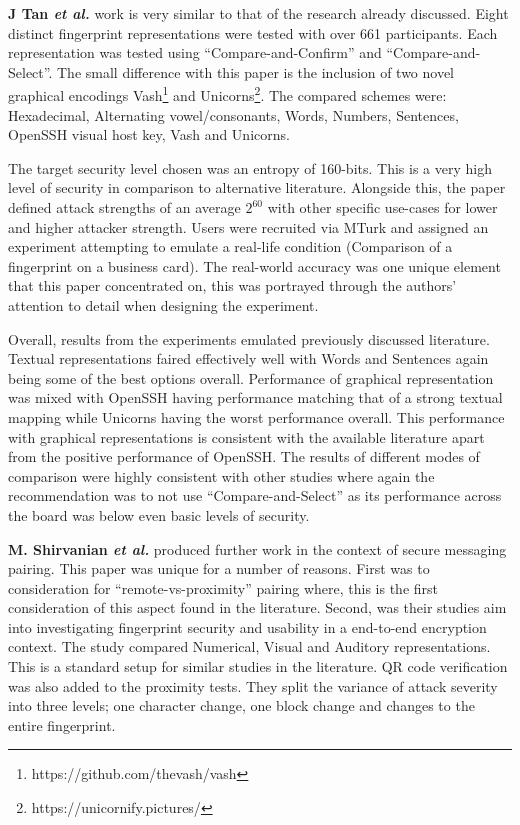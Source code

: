 \textbf{J Tan \textit{et al.}}\cite{tan2017can} work is very similar to that of the research already discussed. Eight distinct fingerprint representations were tested with over 661 participants. Each representation was tested using ``Compare-and-Confirm'' and ``Compare-and-Select''. The small difference with this paper is the inclusion of two novel graphical encodings Vash\footnote{https://github.com/thevash/vash} and Unicorns\footnote{https://unicornify.pictures/}. The compared schemes were: Hexadecimal, Alternating vowel/consonants, Words, Numbers, Sentences, OpenSSH visual host key, Vash and Unicorns.

The target security level chosen was an entropy of 160-bits. This is a very high level of security in comparison to alternative literature. Alongside this, the paper defined attack strengths of an average $2^{60}$ with other specific use-cases for lower and higher attacker strength. Users were recruited via MTurk and assigned an experiment attempting to emulate a real-life condition (Comparison of a fingerprint on a business card). The real-world accuracy was one unique element that this paper concentrated on, this was portrayed through the authors' attention to detail when designing the experiment.

Overall, results from the experiments emulated previously discussed literature. Textual representations faired effectively well with Words and Sentences again being some of the best options overall. Performance of graphical representation was mixed with OpenSSH having performance matching that of a strong textual mapping while Unicorns having the worst performance overall. This performance with graphical representations is consistent with the available literature apart from the positive performance of OpenSSH. The results of different modes of comparison were highly consistent with other studies where again the recommendation was to not use ``Compare-and-Select'' as its performance across the board was below even basic levels of security.

\textbf{M. Shirvanian \textit{et al.}}\cite{shirvanian2017pitfalls} produced further work in the context of secure messaging pairing. This paper was unique for a number of reasons. First was to consideration for ``remote-vs-proximity'' pairing where, this is the first consideration of this aspect found in the literature. Second, was their studies aim into investigating fingerprint security and usability in a end-to-end encryption context. The study compared Numerical, Visual and Auditory representations. This is a standard setup for similar studies in the literature. QR code verification was also added to the proximity tests. They split the variance of attack severity into three levels; one character change, one block change and changes to the entire fingerprint.


